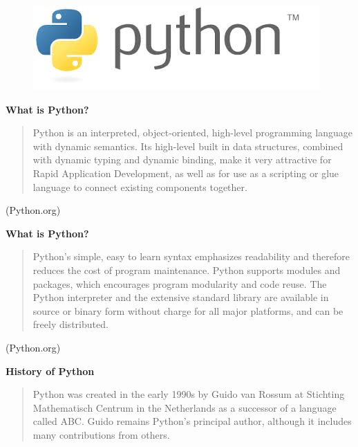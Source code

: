 \documentclass{beamer}
\begin{document}
	\begin{frame}
		\begin{figure}
\centering
\includegraphics[width=1.1\linewidth]{pythonlogo}

\end{figure}

	\end{frame}
	\begin{frame}
	\Large
	\textbf{What is Python?}
	\begin{quote}
		Python is an interpreted, object-oriented, high-level programming language with dynamic semantics. Its high-level built in data structures, combined with dynamic typing and dynamic binding, make it very attractive for Rapid Application Development, as well as for use as a scripting or glue language to connect existing components together. 
	\end{quote}
	
	(Python.org)
	\end{frame}

	\begin{frame}
		\Large
			\textbf{What is Python?}
		\begin{quote}
			Python's simple, easy to learn syntax emphasizes readability and therefore reduces the cost of program maintenance. Python supports modules and packages, which encourages program modularity and code reuse. The Python interpreter and the extensive standard library are available in source or binary form without charge for all major platforms, and can be freely distributed.
		\end{quote}
			(Python.org)
	\end{frame}
\begin{frame}
		\Large
		\textbf{History of Python}
		\begin{quote}
	Python was created in the early 1990s by Guido van Rossum at Stichting Mathematisch Centrum in the Netherlands as a successor of a language called ABC. Guido remains Python’s principal author, although it includes many contributions from others.
	\end{quote}
\end{frame}
\end{document}
